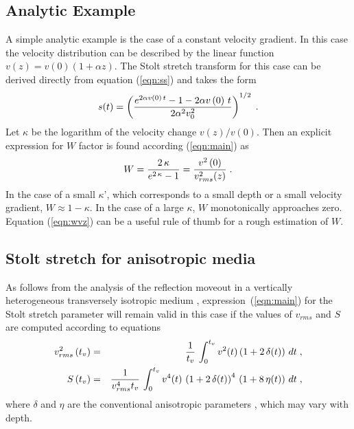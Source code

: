 \subsection{Analytic Example}
A simple analytic example is the case of a constant velocity gradient.
In this case the velocity distribution can be described by the linear
function $v\left(z\right)=v\left(0\right)(1+\alpha z)$. The Stolt
stretch transform for this case can be derived directly from equation
(\ref{eqn:ss}) and takes the form
\begin{equation}
s(t)=\left({e^{2 \alpha v\left(0\right)\,t} -1 -
2 \alpha v\left(0\right)\,t} \over 
{2 \alpha^2 v_0^2}\right)^{1/2}\;.
\label{eqn:ssvz} 
\end{equation}
Let $\kappa$ be the logarithm of the velocity change $v(z)/v(0)$. Then
an explicit expression for $W$ factor is found according
(\ref{eqn:main}) as
\begin{equation}
W={{2\,\kappa}\over{e^{2\,\kappa}-1}}={v^2\left(0\right) \over
v_{rms}^2(z)}\;.
\label{eqn:wvz} 
\end{equation}
In the case of a small $\kappa$', which corresponds to a small depth
or a small velocity gradient, $W \approx 1-\kappa$. In the case of a
large $\kappa$, $W$ monotonically approaches zero. Equation
(\ref{eqn:wvz}) can be a useful rule of thumb for a rough estimation
of $W$.

\subsection{Stolt stretch for anisotropic media}

As follows from the analysis of the reflection moveout in a vertically
heterogeneous transversely isotropic medium \cite[]{Fomel.sep.92.135},
expression~(\ref{eqn:main}) for the Stolt stretch parameter will
remain valid in this case if the values of $v_{rms}$ and $S$ are
computed according to equations
\begin{eqnarray}
v_{rms}^2\left(t_v\right) & = &
{1 \over t_v}\,\int_{0}^{t_v} v^2(t) \left(1 + 2\,\delta(t)\right)\,dt\;,
\label{eqn:TIvrms} \\
S\left(t_v\right) & = & {1 \over{v_{rms}^4 t_v}}\,\int_{0}^{t_v} v^4(t) \,
\left(1 + 2\,\delta(t)\right)^4\,\left(1 + 8\,\eta(t)\right) \,dt\;,
\label{eqn:TIsk}
\end{eqnarray}
where $\delta$ and $\eta$ are the conventional anisotropic parameters
\cite[]{GEO51-10-19541966,GEO60-05-15501566}, which may vary with depth.


